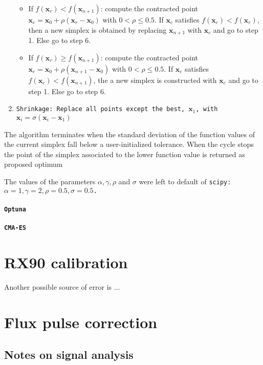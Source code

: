 \begin{enumerate}
\begin{itemize}
        \item If $f(\mathbf{x}_r) < f(\mathbf{x}_{n+1})$: compute the contracted point $\mathbf{x}_c=\mathbf{x}_0 +\rho(\mathbf{x}_{r}-\mathbf{x}_0)$ with $0<\rho \leq 0.5$.
                If $\mathbf{x}_c$ satisfies $f(\mathbf{x}_c) < f(\mathbf{x}_{r})$, then a new simplex is obtained by replacing $\mathbf{x}_{n+1}$ with  $\mathbf{x}_c$ and go to step 1.
                Else go to step 6.
        \item  If $f(\mathbf{x}_r) \geq f(\mathbf{x}_{n+1})$: compute the contracted point $\mathbf{x}_c=\mathbf{x}_0 +\rho(\mathbf{x}_{n+1}-\mathbf{x}_0)$ with $0<\rho \leq 0.5$.
                If $\mathbf{x}_c$ satisfies $f(\mathbf{x}_c) < f(\mathbf{x}_{n+1})$, the a new simplex is constructed with $\mathbf{x}_c$ and go to step 1.
                Else go to step 6.
    \end{itemize}
    \item \tt{Shrinkage}: Replace all points except the best, $\mathbf{x}_1$, with $\mathbf{x}_i = \sigma(\mathbf{x}_i - \mathbf{x}_1)$  
\end{enumerate}
The algorithm terminates when the standard deviation of the function values of the current simplex fall below a user-initialized tolerance. 
When the cycle stops the point of the simplex associated to the lower function value is returned as proposed optimum

The values of the parameters $\alpha, \gamma, \rho$ and $\sigma$ were left to default of \tt{scipy}: $\alpha=1, \gamma=2, \rho=0.5, \sigma=0.5$. 

\paragraph{\tt{Optuna}}
\cite{optuna_2019}

\paragraph{\tt{CMA-ES}}
\cite{cmaessimplepractical}

\section{RX90 calibration}
Another possible source of error is ...

\section{Flux pulse correction}
\subsection{Notes on signal analysis}


